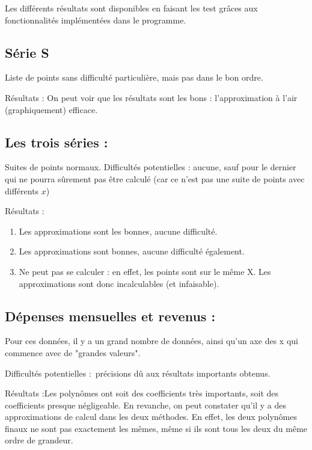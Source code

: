 \documentclass[letter]{article}
\begin{document}
Les différents résultats sont disponibles en faisant les test grâces aux fonctionnalités implémentées dans le programme.


\subsection{Série S}
\label{sec:org09e3a08}

Liste de points sans difficulté particulière, mais pas dans le bon ordre.

Résultats : On peut voir que les résultats sont les bons : l'approximation à l'air (graphiquement) efficace.



\subsection{Les trois séries :}
\label{sec:org0de77dd}

Suites de points normaux.
Difficultés potentielles : aucune, sauf pour le dernier qui ne pourra sûrement pas être calculé (car ce n'est pas une suite de points avec différents \(x\))


Résultats : 

\begin{enumerate}
\item Les approximations sont les bonnes, aucune difficulté.

\item Les approximations sont bonnes, aucune difficulté également.

\item Ne peut pas se calculer : en effet, les points sont sur le même X. Les approximations sont donc incalculables (et infaisable).
\end{enumerate}


\subsection{Dépenses mensuelles et revenus :}
\label{sec:org550909f}

Pour ces données, il y a un grand nombre de données, ainsi qu'un axe des x qui commence avec de "grandes valeurs".

Difficultés potentielles : précisions dû aux résultats importants obtenus.


Résultats :Les polynômes ont soit des coefficients très importants, soit des coefficients presque négligeable. En revanche, on peut constater qu'il y a des approximations de calcul dans les deux méthodes. En effet, les deux polynômes finaux ne sont pas exactement les mêmes, même si ils sont tous les deux du même ordre de grandeur.
\end{document}
